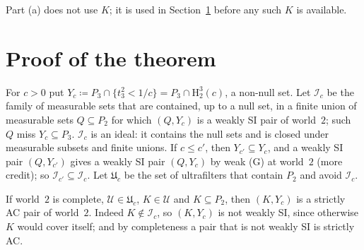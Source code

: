 \documentclass[11pt]{article}
\theoremstyle{definition}\newtheorem{definition}[theorem]{Definition}
\theoremstyle{remark}\newtheorem{remark}[theorem]{Remark}
\newcommand{\Iid}{\mathcal I}
\newcommand{\Uf}{\mathcal U}
\newcommand{\UU}{\mathfrak U}
\newcommand{\Hi}[3]{\mathrm H^{#1}_{#2}(#3)}
\begin{document}
Part (a) does not use $K$; it is used in Section~\ref{sec:proof} before any
such $K$ is available.

\section{Proof of the theorem}\label{sec:proof}

For $c>0$ put $Y_c\coloneqq P_3\cap\{t^2_3<1/c\}=P_3\cap\Hi32c$, a non-null
set. Let $\Iid_c$ be the family of measurable sets that are contained, up to
a null set, in a finite union of measurable sets $Q\subseteq P_2$ for which
$(Q,Y_c)$ is a weakly SI pair of world~$2$; such $Q$ miss $Y_c\subseteq
P_3$. $\Iid_c$ is an ideal: it contains the null sets and is closed under
measurable subsets and finite unions. If $c\le c'$, then $Y_{c'}\subseteq
Y_c$, and a weakly SI pair $(Q,Y_{c'})$ gives a weakly SI pair $(Q,Y_c)$ by
weak (G) at world~$2$ (more credit); so $\Iid_{c'}\subseteq\Iid_c$. Let
$\UU_c$ be the set of ultrafilters that contain $P_2$ and avoid $\Iid_c$.

If world~$2$ is complete, $\Uf\in\UU_c$, $K\in\Uf$ and $K\subseteq P_2$,
then $(K,Y_c)$ is a strictly AC pair of world~$2$. Indeed $K\notin\Iid_c$,
so $(K,Y_c)$ is not weakly SI, since otherwise $K$ would cover itself; and
by completeness a pair that is not weakly SI is strictly AC.
\end{document}
